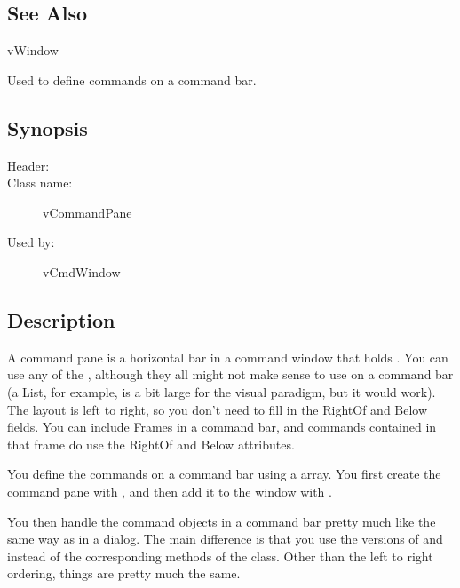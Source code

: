 
\subsection* {See Also}

vWindow



Used to define commands on a command bar.

\subsection* {Synopsis}

\begin{description}
	\item [Header:] 
	\item [Class name:] vCommandPane
	\item [Used by:] vCmdWindow
\end{description}

\subsection* {Description}

A command pane is a horizontal bar in a command window that
holds .  You can use any of the
, although they all might not make sense
to use on a command bar (a List, for example, is a bit large for
the visual paradigm, but it would work). The layout
is left to right, so you don't need to fill in the RightOf
and Below fields. You can include Frames in a command bar,
and commands contained in that frame do use the RightOf
and Below attributes. 

You define the commands on a command bar using a
 array. You first create the command pane
with , and
then add it to the window with .

You then handle the command objects in a command bar pretty much
like the same way as in a dialog. The main difference is that you
use the  versions of  and 
instead of the corresponding methods of the  class.
Other than the left to right ordering, things are pretty much the
same.


